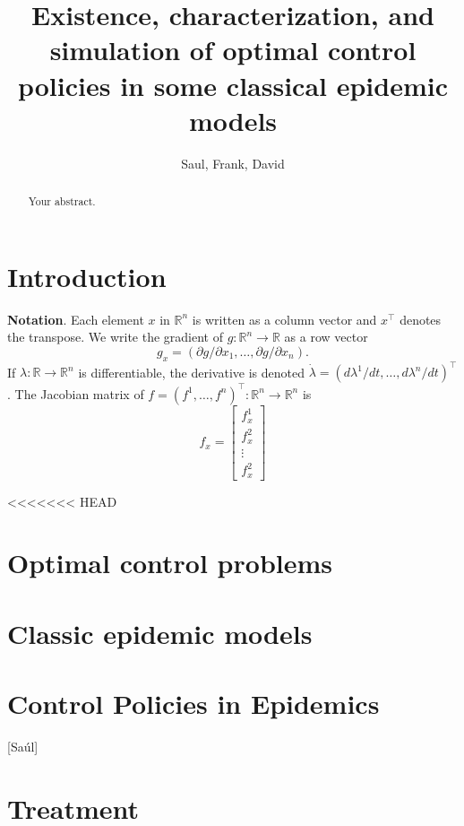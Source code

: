 \documentclass[a4paper]{amsart}
\title[%
	Existence, characterization and simulation of OCP for some epidemic 
	Models%
	]{
	Existence, characterization, and simulation
	of optimal control policies in some classical epidemic models
}
\author{Saul, Frank, David}
\newcommand{\R}{\mathbb{R}}
\begin{document}
	\maketitle
\maketitle

\begin{abstract}
	Your abstract.
\end{abstract}

\section{Introduction}

{\bf Notation}. Each element $x$ in $\R^n$ is written as a column vector and $x^\top$ denotes the transpose. We write the gradient of $g:\R^n\to\R$ as a row vector 
    \[ g_x =(\partial g/\partial x_1,\ldots, \partial g/\partial x_n). \]
If $\lambda:\R\to\R^n$ is differentiable, the derivative is denoted $\dot{\lambda}=(d\lambda^1/dt,\ldots,d\lambda^n/dt)^\top$. The Jacobian matrix of $f=(f^1,\ldots,f^n)^\top:\R^n\to\R^n$ is   
\[f_x=\begin{bmatrix}
f^1_x\\
f^2_x\\
\vdots \\
f^2_x
\end{bmatrix}\]

<<<<<<< HEAD
  \section{Optimal control problems}
    
  \section{Classic epidemic models}
  \section{Control Policies in Epidemics}
  [Saúl]
      
      \section{Treatment}
        
\end{document}
